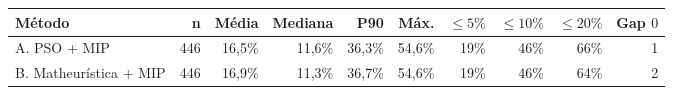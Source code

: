 \begin{tabular}{lrrrrrrrrr}
\toprule
Método & n & Média & Mediana & P90 & Máx. & $\le 5\%$ & $\le 10\%$ & $\le 20\%$ & Gap $0$ \\
\midrule
A. PSO + MIP & 446 & 16,5\% & 11,6\% & 36,3\% & 54,6\% & 19\% & 46\% & 66\% & 1 \\
B. Matheurística + MIP & 446 & 16,9\% & 11,3\% & 36,7\% & 54,6\% & 19\% & 46\% & 64\% & 2 \\
\bottomrule
\end{tabular}
